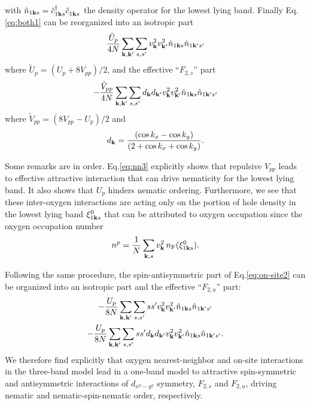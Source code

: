 \documentclass[prb, twocolumn,showpacs,preprintnumbers,amsmath,amssymb, floatfix]{revtex4}
\begin{document}
with $\hat{n}_{1{\bf k} s} = \hat{c}_{1 {\bf k} s}^{\dag}\hat{c}_{1{\bf k}
  s}^{\phantom{\dag}}$  the density operator for the lowest lying
band.
Finally Eq.\eqref{eq:both1} can be reorganized into an isotropic
part
\begin{equation}  
  \frac{\tilde{U}_{p}}{4N} \sum_{{\bf k}, {\bf k}'}\sum_{s,
    s'}v_{{\bf k}}^2v_{{\bf k}'}^2\hat{n}_{1{\bf k} s} \hat{n}_{1{\bf k}' s'}
  \label{eq:on-site3}
  \end{equation}
where $\tilde{U}_p = (U_p + 8V_{pp})/2$, and the effective ``$F_{2,s}$'' part
\begin{equation}
  -\frac{\tilde{V}_{pp}}{4 N} \sum_{{\bf k}, {\bf k}'}\sum_{s, s'}d_{{\bf k}}d_{{\bf k}'}v_{{\bf k}}^2v_{{\bf k}'}^2\hat{n}_{1{\bf k} s} \hat{n}_{1{\bf k}' s'}
  \label{eq:nn3}
  \end{equation}
where $\tilde{V}_{pp} = (8V_{pp} - U_p)/2$ and
\begin{equation}
  d_{{\bf k}} = \frac{(\cos k_x - \cos k_y)}{(2 + \cos k_x + \cos k_y)}.
  \label{eq:dk}
\end{equation}

Some remarks are in order. Eq.\eqref{eq:nn3} explicitly shows that
repulsive $V_{pp}$ leads to effective attractive interaction that can
drive nematicity for the lowest lying band. It also shows that $U_p$
hinders nematic ordering. Furthermore, we see that
these inter-oxygen interactions are acting only on 
the portion of hole density in the lowest lying band $\xi_{1{\bf k}
  s}^{0}$ that can be attributed to oxygen
occupation since 
the oxygen occupation number
\begin{equation}
  n^p = \frac{1}{N}\sum_{{\bf k}, s}v_{{\bf k}}^2\, n_{\rm F}(\xi_{1{\bf k} s}^{0}).
  \label{eq:npeta0}
\end{equation}

Following the same procedure, the spin-antisymmetric part of
Eq.\eqref{eq:on-site2}  can be organized into an
isotropic part and the effective ``$F_{2,a}$'' part:
\begin{multline}
  -\frac{U_{p}}{8N} \sum_{{\bf k}, {\bf k}'}\sum_{s, s'} s s' v_{{\bf k}}^2v_{{\bf k}'}^2\hat{n}_{1{\bf k} s} \hat{n}_{1{\bf k}' s'}\\
  -\frac{U_p}{8 N} \sum_{{\bf k}, {\bf k}'}\sum_{s, s'}s s' d_{{\bf k}}d_{{\bf k}'}v_{{\bf k}}^2v_{{\bf k}'}^2\hat{n}_{1{\bf k} s} \hat{n}_{1{\bf k}' s'}.
  \label{eq:nsn_m}
\end{multline}
We therefore find explicitly that oxygen nearest-neighbor and on-site
interactions in the three-band model lead in a one-band model to
attractive spin-symmetric and antisymmetric interactions of
$d_{x^2-y^2}$ symmetry, $F_{2,s}$ and $F_{2,a}$, driving nematic and
nematic-spin-nematic order, respectively.
\end{document}
